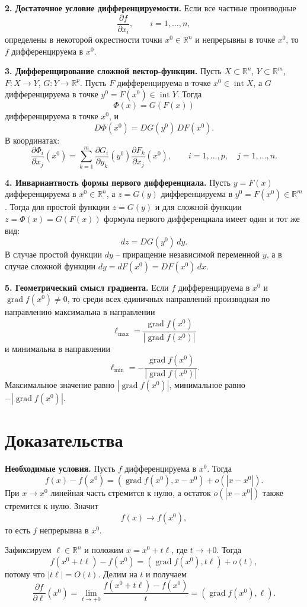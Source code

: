 \documentclass[12pt,a4paper]{article}
\newcommand{\R}{\mathbb{R}}
\newcommand{\grad}{\operatorname{grad}}
\newcommand{\Int}{\operatorname{int}}
\newcommand{\Jac}{D}
\begin{document}
\textbf{2. Достаточное условие дифференцируемости.}
Если все частные производные
\[
  \frac{\partial f}{\partial x_i},\qquad i=1,\dots,n,
\]
определены в некоторой окрестности точки \(x^0\in\R^n\) и непрерывны в точке
\(x^0\), то \(f\) дифференцируема в \(x^0\).

\textbf{3. Дифференцирование сложной вектор-функции.}
Пусть \(X\subset\R^n\), \(Y\subset\R^m\), \(F:X\to Y\), \(G:Y\to\R^p\).
Пусть \(F\) дифференцируема в точке \(x^0\in\Int X\), а \(G\)
дифференцируема в точке \(y^0=F(x^0)\in\Int Y\). Тогда
\[
  \Phi(x)=G(F(x))
\]
дифференцируема в точке \(x^0\), и
\[
  \Jac\Phi(x^0)=\Jac G(y^0)\,\Jac F(x^0).
\]
В координатах:
\[
  \frac{\partial \Phi_i}{\partial x_j}(x^0)
  =
  \sum_{k=1}^m
  \frac{\partial G_i}{\partial y_k}(y^0)
  \frac{\partial F_k}{\partial x_j}(x^0),
  \qquad i=1,\dots,p,\quad j=1,\dots,n.
\]

\textbf{4. Инвариантность формы первого дифференциала.}
Пусть \(y=F(x)\) дифференцируема в \(x^0\in\R^n\), а \(z=G(y)\)
дифференцируема в \(y^0=F(x^0)\in\R^m\). Тогда для простой функции
\(z=G(y)\) и для сложной функции \(z=\Phi(x)=G(F(x))\) формула первого
дифференциала имеет один и тот же вид:
\[
  dz=\Jac G(y^0)\,dy.
\]
В случае простой функции \(dy\) -- приращение независимой переменной \(y\), а
в случае сложной функции \(dy=dF(x^0)=\Jac F(x^0)\,dx\).

\textbf{5. Геометрический смысл градиента.}
Если \(f\) дифференцируема в \(x^0\) и \(\grad f(x^0)\ne0\), то среди всех
единичных направлений производная по направлению максимальна в направлении
\[
  \ell_{\max}=\frac{\grad f(x^0)}{|\grad f(x^0)|}
\]
и минимальна в направлении
\[
  \ell_{\min}=-\frac{\grad f(x^0)}{|\grad f(x^0)|}.
\]
Максимальное значение равно \(|\grad f(x^0)|\), минимальное равно
\(-|\grad f(x^0)|\).

\section*{Доказательства}

\textbf{Необходимые условия.}
Пусть \(f\) дифференцируема в \(x^0\). Тогда
\[
  f(x)-f(x^0)=(\grad f(x^0),x-x^0)+o(|x-x^0|).
\]
При \(x\to x^0\) линейная часть стремится к нулю, а остаток
\(o(|x-x^0|)\) также стремится к нулю. Значит
\[
  f(x)\to f(x^0),
\]
то есть \(f\) непрерывна в \(x^0\).

Зафиксируем \(\ell\in\R^n\) и положим \(x=x^0+t\ell\), где \(t\to+0\). Тогда
\[
  f(x^0+t\ell)-f(x^0)
  =
  (\grad f(x^0),t\ell)+o(t),
\]
потому что \(|t\ell|=O(t)\). Делим на \(t\) и получаем
\[
  \frac{\partial f}{\partial \ell}(x^0)
  =
  \lim_{t\to+0}
  \frac{f(x^0+t\ell)-f(x^0)}{t}
  =
  (\grad f(x^0),\ell).
\]
\end{document}
